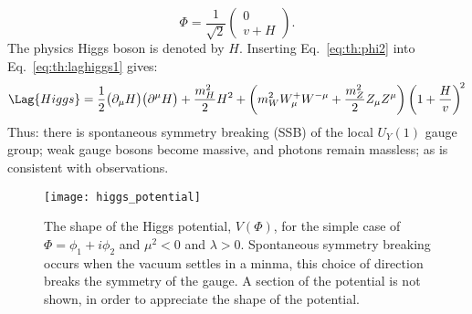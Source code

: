 \begin{equation}
  \Phi = \frac{1}{\sqrt{2}}
  \begin{pmatrix} 0 \\ v+H
  \end{pmatrix}.
  \label{eq:th:phi2}
\end{equation}
The physics Higgs boson is denoted by $H$.
Inserting Eq.~\ref{eq:th:phi2} into Eq.~\ref{eq:th:laghiggs1} gives:
\begin{equation}
  \Lag{Higgs} =
  \frac{1}{2}\big(\partial_\mu H\big)\big(\partial^\mu H\big)
  +\frac{m_H^2}{2}H^2
  +\left(m_W^2W_\mu^+W^{-\mu} + \frac{m_Z^2}{2}Z_\mu Z^\mu\right)
  \left(1 + \frac{H}{v}\right)^{\!2}
  \label{eq:th:laghiggs2}
\end{equation}
Thus: there is spontaneous symmetry breaking (SSB) of the local $U_Y(1)$ gauge group; weak gauge
bosons become massive, and photons remain massless; as is consistent with observations.

\begin{figure}
  \begin{center}
    \texttt{[image: higgs\_potential]}
    \caption[The Higgs potential]
    {\small
      The shape of the Higgs potential, $V(\Phi)$, for the simple case of $\Phi=\phi_1+i\phi_2$ and
      $\mu^2<0$ and $\lambda>0$.
      Spontaneous symmetry breaking occurs when the vacuum settles in a minma, this choice of
      direction breaks the symmetry of the gauge.
      A section of the potential is not shown, in order to appreciate the shape of the potential.
    }
    \label{fig:th:higgspot}
  \end{center}
\end{figure}

